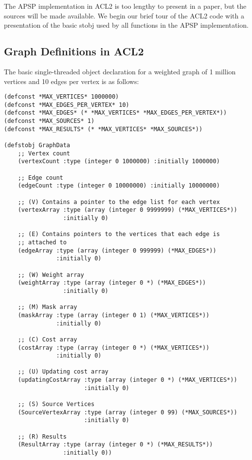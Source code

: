 \documentclass[copyright]{eptcs}
\begin{document}
The APSP implementation in ACL2 is too lengthy to present in
a paper, but the sources will be made available.  We begin our brief tour of
the ACL2 code with a presentation of the basic stobj used by all functions
in the APSP implementation.

\subsection{Graph Definitions in ACL2}\label{arraysetDef}

The basic single-threaded object declaration for a 
weighted graph of 1 million vertices and 10 edges per vertex is as follows:

\begin{verbatim}
(defconst *MAX_VERTICES* 1000000)
(defconst *MAX_EDGES_PER_VERTEX* 10)
(defconst *MAX_EDGES* (* *MAX_VERTICES* *MAX_EDGES_PER_VERTEX*))
(defconst *MAX_SOURCES* 1)
(defconst *MAX_RESULTS* (* *MAX_VERTICES* *MAX_SOURCES*))

(defstobj GraphData
    ;; Vertex count
    (vertexCount :type (integer 0 1000000) :initially 1000000)

    ;; Edge count
    (edgeCount :type (integer 0 10000000) :initially 10000000)

    ;; (V) Contains a pointer to the edge list for each vertex
    (vertexArray :type (array (integer 0 9999999) (*MAX_VERTICES*)) 
                 :initially 0)

    ;; (E) Contains pointers to the vertices that each edge is 
    ;; attached to
    (edgeArray :type (array (integer 0 999999) (*MAX_EDGES*)) 
               :initially 0)

    ;; (W) Weight array
    (weightArray :type (array (integer 0 *) (*MAX_EDGES*)) 
                 :initially 0)

    ;; (M) Mask array
    (maskArray :type (array (integer 0 1) (*MAX_VERTICES*)) 
               :initially 0)

    ;; (C) Cost array
    (costArray :type (array (integer 0 *) (*MAX_VERTICES*)) 
               :initially 0)

    ;; (U) Updating cost array
    (updatingCostArray :type (array (integer 0 *) (*MAX_VERTICES*)) 
                       :initially 0)

    ;; (S) Source Vertices
    (SourceVertexArray :type (array (integer 0 99) (*MAX_SOURCES*)) 
                       :initially 0)

    ;; (R) Results
    (ResultArray :type (array (integer 0 *) (*MAX_RESULTS*)) 
                 :initially 0))
\end{verbatim}
\end{document}
